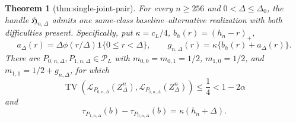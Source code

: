 \documentclass{article}
\newtheorem{theorem}{Theorem}
\begin{document}
\begin{theorem}[thm:single-joint-pair]\label{thm:single-joint-pair}
For every \(n\ge256\) and \(0<\Delta\le\Delta_0\), the handle \(\mathfrak H_{n,\Delta}\) admits one same-class baseline--alternative realization with both difficulties present.  Specifically, put \(\kappa=c_L/4\), \(b_h(r)=(h_n-r)_+\),
\[
 a_\Delta(r)=\Delta\phi(r/\Delta)\mathbf 1\{0\le r<\Delta\},
 \qquad
 g_{n,\Delta}(r)=\kappa\{b_h(r)+a_\Delta(r)\}.
\]
There are \(P_{0,n,\Delta},P_{1,n,\Delta}\in\mathcal P_L\) with \(m_{0,0}=m_{0,1}=1/2\), \(m_{1,0}=1/2\), and \(m_{1,1}=1/2+g_{n,\Delta}\), for which
\[
 \operatorname{TV}\!\left(\mathcal L_{P_{0,n,\Delta}}(Z_\Delta^n),
 \mathcal L_{P_{1,n,\Delta}}(Z_\Delta^n)\right)
 \le\frac14<1-2\alpha
\]
and
\[
 \tau_{P_{1,n,\Delta}}(b)-\tau_{P_{0,n,\Delta}}(b)
 =\kappa(h_n+\Delta).
\]
\end{theorem}
\end{document}
